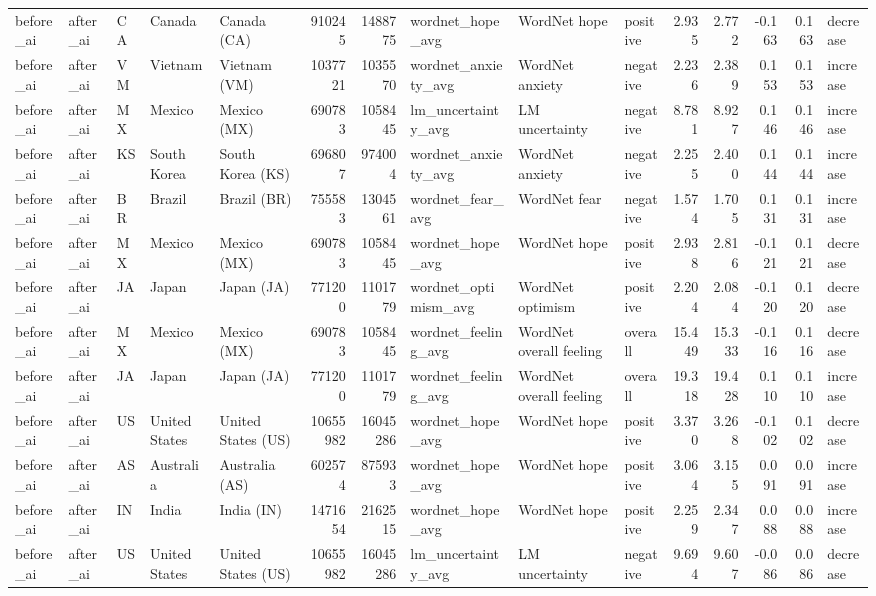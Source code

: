 \begin{tabular}{lllllrrlllrrrrl}
before\_ai & after\_ai & CA & Canada & Canada (CA) & 910245 & 1488775 & wordnet\_hope\_avg & WordNet hope & positive & 2.935 & 2.772 & -0.163 & 0.163 & decrease \\
before\_ai & after\_ai & VM & Vietnam & Vietnam (VM) & 1037721 & 1035570 & wordnet\_anxiety\_avg & WordNet anxiety & negative & 2.236 & 2.389 & 0.153 & 0.153 & increase \\
before\_ai & after\_ai & MX & Mexico & Mexico (MX) & 690783 & 1058445 & lm\_uncertainty\_avg & LM uncertainty & negative & 8.781 & 8.927 & 0.146 & 0.146 & increase \\
before\_ai & after\_ai & KS & South Korea & South Korea (KS) & 696807 & 974004 & wordnet\_anxiety\_avg & WordNet anxiety & negative & 2.255 & 2.400 & 0.144 & 0.144 & increase \\
before\_ai & after\_ai & BR & Brazil & Brazil (BR) & 755583 & 1304561 & wordnet\_fear\_avg & WordNet fear & negative & 1.574 & 1.705 & 0.131 & 0.131 & increase \\
before\_ai & after\_ai & MX & Mexico & Mexico (MX) & 690783 & 1058445 & wordnet\_hope\_avg & WordNet hope & positive & 2.938 & 2.816 & -0.121 & 0.121 & decrease \\
before\_ai & after\_ai & JA & Japan & Japan (JA) & 771200 & 1101779 & wordnet\_optimism\_avg & WordNet optimism & positive & 2.204 & 2.084 & -0.120 & 0.120 & decrease \\
before\_ai & after\_ai & MX & Mexico & Mexico (MX) & 690783 & 1058445 & wordnet\_feeling\_avg & WordNet overall feeling & overall & 15.449 & 15.333 & -0.116 & 0.116 & decrease \\
before\_ai & after\_ai & JA & Japan & Japan (JA) & 771200 & 1101779 & wordnet\_feeling\_avg & WordNet overall feeling & overall & 19.318 & 19.428 & 0.110 & 0.110 & increase \\
before\_ai & after\_ai & US & United States & United States (US) & 10655982 & 16045286 & wordnet\_hope\_avg & WordNet hope & positive & 3.370 & 3.268 & -0.102 & 0.102 & decrease \\
before\_ai & after\_ai & AS & Australia & Australia (AS) & 602574 & 875933 & wordnet\_hope\_avg & WordNet hope & positive & 3.064 & 3.155 & 0.091 & 0.091 & increase \\
before\_ai & after\_ai & IN & India & India (IN) & 1471654 & 2162515 & wordnet\_hope\_avg & WordNet hope & positive & 2.259 & 2.347 & 0.088 & 0.088 & increase \\
before\_ai & after\_ai & US & United States & United States (US) & 10655982 & 16045286 & lm\_uncertainty\_avg & LM uncertainty & negative & 9.694 & 9.607 & -0.086 & 0.086 & decrease \\

\end{tabular}
